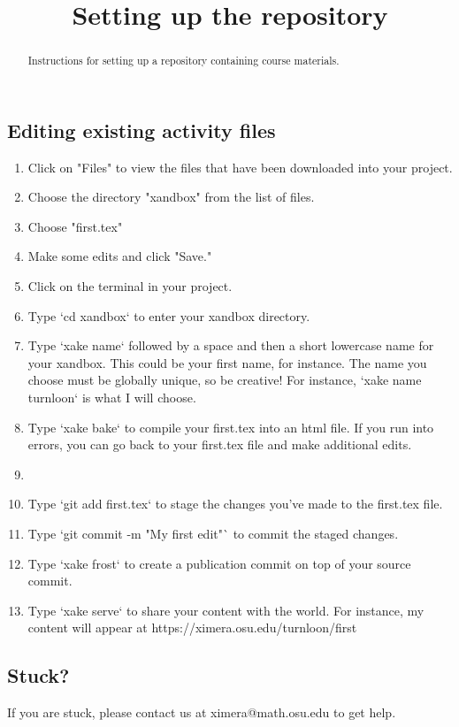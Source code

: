 \documentclass{ximera}
\title{Setting up the repository}
\begin{document}
\begin{abstract}
Instructions for setting up a repository containing course materials.
\end{abstract}
\maketitle


\subsection{Editing existing activity files}
\begin{enumerate}

\item Click on "Files" to view the files that have been downloaded into your project.
\item Choose the directory "xandbox" from the list of files.
\item Choose "first.tex"
\item Make some edits and click "Save."
\item Click on the terminal in your project.
\item Type `cd xandbox` to enter your xandbox directory.
\item Type `xake name` followed by a space and then a short lowercase name for your xandbox.  This could be your first name, for instance.  The name you choose must be globally unique, so be creative!  For instance, `xake name turnloon` is what I will choose.
\item Type `xake bake` to compile your first.tex into an html file.  If you run into errors, you can go back to your first.tex file and make additional edits.
\item 
\item Type `git add first.tex` to stage the changes you've made to the first.tex file.
\item Type `git commit -m "My first edit"` to commit the staged changes.
\item Type `xake frost` to create a publication commit on top of your source commit.
\item Type `xake serve` to share your content with the world.  For instance, my content will appear at https://ximera.osu.edu/turnloon/first
\end{enumerate}
\subsection{Stuck?}

If you are stuck, please contact us at ximera@math.osu.edu to get help.
\end{document}
